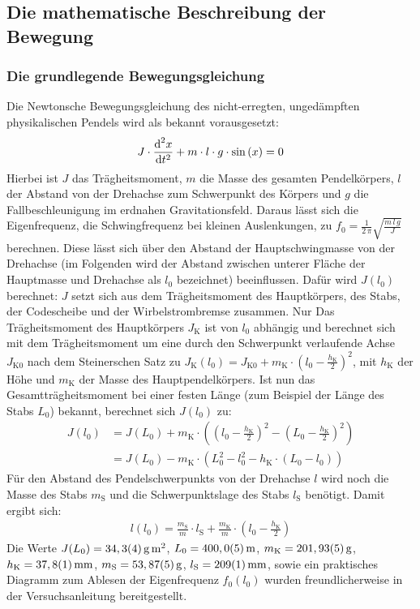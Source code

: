 \documentclass[numbers=noenddot,12pt,a4paper]{scrartcl}
\newcommand{\diff}{\textnormal{d}}
\newcommand{\ix}[1]{_\text{#1}}
\begin{document}
\subsection{Die mathematische Beschreibung der Bewegung}
\subsubsection{Die grundlegende Bewegungsgleichung}
Die Newtonsche Bewegungsgleichung des nicht-erregten, ungedämpften physikalischen Pendels wird als bekannt vorausgesetzt:
\begin{align}
J\cdot\frac{\diff^2 x}{\diff t^2}+m\cdot l\cdot g\cdot\sin\left(x\right)=0\label{eq:bew1}
\end{align}
Hierbei ist $J$ das Trägheitsmoment, $m$ die Masse des gesamten Pendelkörpers, $l$ der Abstand von der Drehachse zum Schwerpunkt des Körpers und $g$ die Fallbeschleunigung im erdnahen Gravitationsfeld. Daraus lässt sich die Eigenfrequenz, die Schwingfrequenz bei kleinen Auslenkungen, zu $f\ix{0}=\frac{1}{2\,\pi}\sqrt{\frac{m\,l\,g}{J}}$ berechnen. Diese lässt sich über den Abstand der Hauptschwingmasse von der Drehachse (im Folgenden wird der Abstand zwischen unterer Fläche der Hauptmasse und Drehachse als $l\ix{0}$ bezeichnet) beeinflussen. Dafür wird $J(l\ix{0})$ berechnet: $J$ setzt sich aus dem Trägheitsmoment des Hauptkörpers, des Stabs, der Codescheibe und der Wirbelstrombremse zusammen. Nur Das Trägheitsmoment des Hauptkörpers $J\ix{K}$ ist von $l\ix{0}$ abhängig und berechnet sich mit dem Trägheitsmoment um eine durch den Schwerpunkt verlaufende Achse $J\ix{K0}$ nach dem Steinerschen Satz zu $J\ix{K}(l\ix{0})=J\ix{K0}+ m\ix{K}\cdot\left(l\ix{0}-\frac{h\ix{K}}{2}\right)^2$, mit $h\ix{K}$ der Höhe und $m\ix{K}$ der Masse des Hauptpendelkörpers. Ist nun das Gesamtträgheitsmoment bei einer festen Länge (zum Beispiel der Länge des Stabs $L\ix{0}$) bekannt, berechnet sich $J(l\ix{0})$ zu:
\begin{align}
	J(l\ix{0})&=J(L\ix{0})+m\ix{K}\cdot\left(\left(l\ix{0}-\frac{h\ix{K}}{2}\right)^2-\left(L\ix{0}-\frac{h\ix{K}}{2}\right)^2\right)\nonumber\\
	&=J(L\ix{0})-m\ix{K}\cdot\left(L\ix{0}^2-l\ix{0}^2-h\ix{K}\cdot\left(L\ix{0}-l\ix{0}\right)\right)
\end{align}
Für den Abstand des Pendelschwerpunkts von der Drehachse $l$ wird noch die Masse des Stabs $m\ix{S}$ und die Schwerpunktslage des Stabs $l\ix{S}$ benötigt. Damit ergibt sich:
\begin{align}
	l(l\ix{0})=\frac{m\ix{S}}{m}\cdot l\ix{S}+\frac{m\ix{K}}{m}\cdot\left(l\ix{0}-\frac{h\ix{K}}{2}\right)
\end{align}
Die Werte $J(L\ix{0})=\unit[34,3(4)]{g\,m^2}$, $L\ix{0}=\unit[400,0(5)]{m}$, $m\ix{K}=\unit[201,93(5)]{g}$, $h\ix{K}=\unit[37,8(1)]{mm}$, $m\ix{S}=\unit[53,87(5)]{g}$, $l\ix{S}=\unit[209(1)]{mm}$, sowie ein praktisches Diagramm zum Ablesen der Eigenfrequenz $f\ix{0}(l\ix{0})$ wurden freundlicherweise in der Versuchsanleitung bereitgestellt.
\end{document}
